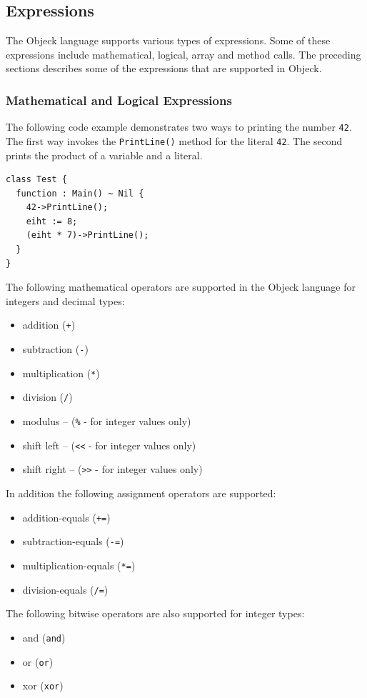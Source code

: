 \documentclass[11pt]{article}
\begin{document}
\subsection{Expressions}
The Objeck language supports various types of expressions.  Some of
these expressions include mathematical, logical, array and method
calls.  The preceding sections describes some of the expressions that
are supported in Objeck.

\subsubsection{Mathematical and Logical Expressions}
The following code example demonstrates two ways to printing the
number \texttt{42}.  The first way invokes the \texttt{PrintLine()}
method for the literal \texttt{42}.  The second prints the product of
a variable and a literal.

\begin{verbatim}
class Test {
  function : Main() ~ Nil {
    42->PrintLine();
    eiht := 8;
    (eiht * 7)->PrintLine();
  }
}
\end{verbatim}

The following mathematical operators are supported in the Objeck
language for integers and decimal types:
\begin{itemize}
\item addition (\texttt{+})
\item subtraction (\texttt{-})
\item multiplication (\texttt{*})
\item division (\texttt{/})
\item modulus -- (\texttt{\%} - for integer values only)
\item shift left -- (\texttt{<<} - for integer values only)
\item shift right -- (\texttt{>>} - for integer values only)
\end{itemize}

In addition the following assignment operators are supported:
\begin{itemize}
\item addition-equals (\texttt{+=})
\item subtraction-equals (\texttt{-=})
\item multiplication-equals (\texttt{*=})
\item division-equals (\texttt{/=})
\end{itemize}

The following bitwise operators are also supported for integer types:
\begin{itemize}
\item and (\texttt{and})
\item or (\texttt{or})
\item xor (\texttt{xor})
\end{itemize}
\end{document}
